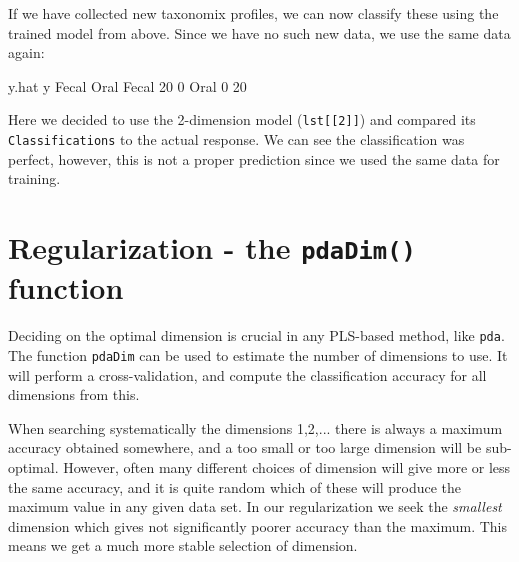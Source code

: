 \documentclass[a4paper]{article}
\begin{document}
If we have collected new taxonomix profiles, we can now classify these using the trained model from above. Since we have no such new data, we use the same data again:
\begin{Schunk}
\begin{Soutput}
       y.hat
y       Fecal Oral
  Fecal    20    0
  Oral      0   20
\end{Soutput}
\end{Schunk}
Here we decided to use the 2-dimension model (\texttt{lst[[2]]}) and compared its \texttt{Classifications} to the actual response. We can see the classification was perfect, however, this is not a proper prediction since we used the same data for training.



\section{Regularization - the \texttt{pdaDim()} function}
Deciding on the optimal dimension is crucial in any PLS-based method, like \texttt{pda}. The function \texttt{pdaDim} can be used to estimate the number of dimensions to use. It will perform a cross-validation, and compute the classification accuracy for all dimensions from this.

When searching systematically the dimensions 1,2,... there is always a maximum accuracy obtained somewhere, and a too small or too large dimension will be sub-optimal. However, often many different choices of dimension will give more or less the same accuracy, and it is quite random which of these will produce the maximum value in any given data set. In our regularization we seek the \emph{smallest} dimension which gives not significantly poorer accuracy than the maximum. This means we get a much more stable selection of dimension.
\end{document}
